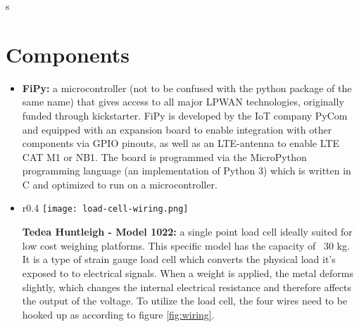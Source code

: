 s
\section{Components}  
\begin{itemize}
  
  \item \textbf{FiPy:} a microcontroller (not to be confused with the python package of the same name) that gives access to all major LPWAN technologies, originally funded through kickstarter.\cite{fipy-kickstarter} FiPy is developed by the IoT company PyCom\cite{pycom} and equipped with an expansion board to enable integration with other components via GPIO pinouts, as well as an LTE-antenna to enable LTE CAT M1 or NB1.\cite{fipy-docs} The board is programmed via the MicroPython programming language (an implementation of Python 3) which is written in C and optimized to run on a microcontroller.\cite{micropython-github}


  \item 
    \parbox[t]{\dimexpr\textwidth-\leftmargin}{%
    \vspace{-2.5mm}
    \begin{wrapfigure}{r}{0.4\textwidth}
      \centering
      \vspace{-\baselineskip}
      \texttt{[image: load-cell-wiring.png]}
      \caption{Wiring schematic\cite{load-cell-manual}}
      \label{fig:wiring}
    \end{wrapfigure}
    \textbf{Tedea Huntleigh - Model 1022:} a single point load cell ideally suited for low cost weighing platforms. This specific model has the capacity of ~30 kg.\cite{load-cell-manual} It is a type of strain gauge load cell which converts the physical load it's exposed to to electrical signals. When a weight is applied, the metal deforms slightly, which changes the internal electrical resistance and therefore affects the output of the voltage.\cite{strain-gauge} To utilize the load cell, the four wires need to be hooked up as according to figure \ref{fig:wiring}.
    }



\end{itemize}
